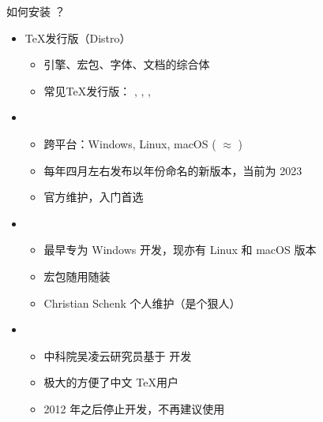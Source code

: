 \begin{frame}{如何安装 ？}
  \begin{itemize}
    \item \TeX{}发行版（Distro）
          \begin{itemize}
            \item 引擎、宏包、字体、文档的综合体
            \item 常见\TeX{}发行版：
                  \alert{\TL}, \MacTeX, \MiKTeX, \CTeX
          \end{itemize}
    \item \TL
          \begin{itemize}
            \item 跨平台：Windows, Linux, macOS (\MacTeX{} $\approx$ \TL)
            \item 每年四月左右发布以年份命名的新版本，当前为 \TL{} 2023
            \item 官方维护，入门首选
          \end{itemize}
    \item \MiKTeX
          \begin{itemize}
            \item 最早专为 Windows 开发，现亦有 Linux 和 macOS 版本
            \item 宏包随用随装
            \item Christian Schenk 个人维护（是个狠人）
          \end{itemize}
    \item \CTeX
          \begin{itemize}
            \item 中科院吴凌云研究员基于 \MiKTeX 开发
            \item 极大的方便了中文 \TeX 用户
            \item 2012 年之后停止开发，\alert{不再建议}使用
          \end{itemize}
  \end{itemize}
\end{frame}

